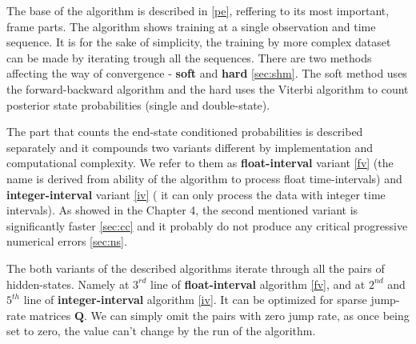 \documentclass[thesis=M,english]{FITthesis}[2012/10/20]
\newcommand{\matr}[1]{\mathbf{#1}}
\begin{document}
The base of the algorithm is described in \ref{pe}, reffering to its most important, frame parts. The algorithm shows training at a single observation and time sequence. 
It is for the sake of simplicity, the training by more complex dataset can be made by iterating trough all the sequences. 
There are two methods affecting the way of convergence - \textbf{soft} and \textbf{hard} \ref{sec:shm}. 
The soft method uses the forward-backward algorithm and the hard uses the Viterbi algorithm to count posterior state probabilities (single and double-state).

The part that counts the end-state conditioned probabilities is described separately and it compounds two variants different by implementation and computational complexity. We refer to them as \textbf{float-interval} variant \ref{fv} (the name is derived from ability of the algorithm to process float time-intervals) and \textbf{integer-interval} variant \ref{iv} ( it can only process the data with integer time intervals). As showed in the Chapter 4, the second mentioned variant is significantly faster \ref{sec:cc} and it probably do not produce any critical progressive numerical errors \ref{sec:ns}.

The both variants of the described algorithms iterate through all the pairs of hidden-states. Namely at $3^{rd}$ line of \textbf{float-interval} algorithm \ref{fv}, and at $2^{nd}$ and $5^{th}$ line of \textbf{integer-interval} algorithm \ref{iv}. It can be optimized for sparse jump-rate matrices $\matr{Q}$. We can simply omit the pairs with zero jump rate, as once being set to zero, the value can't change by the run of the algorithm.       
\end{document}
